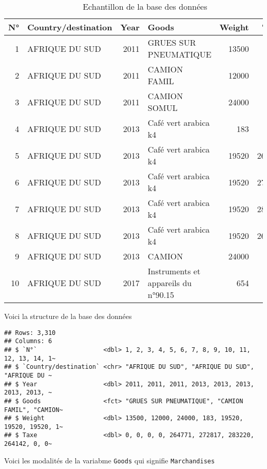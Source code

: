 \documentclass[
]{book}
\begin{document}
\begin{table}

\caption{\label{tab:unnamed-chunk-2}Echantillon de la base des données}
\centering
\begin{tabular}[t]{r|l|r|l|r|r}
\hline
N° & Country/destination & Year & Goods & Weight & Taxe\\
\hline
1 & AFRIQUE DU SUD & 2011 & GRUES SUR PNEUMATIQUE & 13500 & 0\\
\hline
2 & AFRIQUE DU SUD & 2011 & CAMION FAMIL & 12000 & 0\\
\hline
3 & AFRIQUE DU SUD & 2011 & CAMION SOMUL & 24000 & 0\\
\hline
4 & AFRIQUE DU SUD & 2013 & Café vert arabica k4 & 183 & 0\\
\hline
5 & AFRIQUE DU SUD & 2013 & Café vert arabica k4 & 19520 & 264771\\
\hline
6 & AFRIQUE DU SUD & 2013 & Café vert arabica k4 & 19520 & 272817\\
\hline
7 & AFRIQUE DU SUD & 2013 & Café vert arabica k4 & 19520 & 283220\\
\hline
8 & AFRIQUE DU SUD & 2013 & Café vert arabica k4 & 19520 & 264142\\
\hline
9 & AFRIQUE DU SUD & 2013 & CAMION & 24000 & 0\\
\hline
10 & AFRIQUE DU SUD & 2017 & Instruments et appareils du n°90.15 & 654 & 0\\
\hline
\end{tabular}
\end{table}

Voici la structure de la base des données

\begin{verbatim}
## Rows: 3,310
## Columns: 6
## $ `N°`                  <dbl> 1, 2, 3, 4, 5, 6, 7, 8, 9, 10, 11, 12, 13, 14, 1~
## $ `Country/destination` <chr> "AFRIQUE DU SUD", "AFRIQUE DU SUD", "AFRIQUE DU ~
## $ Year                  <dbl> 2011, 2011, 2011, 2013, 2013, 2013, 2013, 2013, ~
## $ Goods                 <fct> "GRUES SUR PNEUMATIQUE", "CAMION FAMIL", "CAMION~
## $ Weight                <dbl> 13500, 12000, 24000, 183, 19520, 19520, 19520, 1~
## $ Taxe                  <dbl> 0, 0, 0, 0, 264771, 272817, 283220, 264142, 0, 0~
\end{verbatim}

Voici les modalités de la variabme \texttt{Goods} qui signifie
\texttt{Marchandises}
\end{document}
